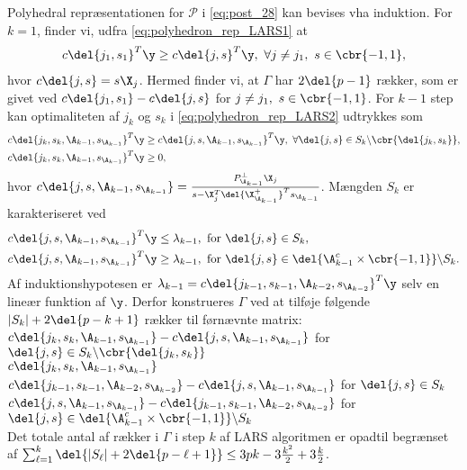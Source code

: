 Polyhedral repræsentationen for \(\mathcal{P}\) i \eqref{eq:post_28} kan bevises vha induktion.
For \(k=1\), finder vi, udfra \eqref{eq:polyhedron_rep_LARS1} at
\begin{align*}
c \del{j_1, s_1}^T \y \geq c \del{j,s}^T \y, \ \forall j \neq j_1, \ s \in \cbr{-1,1},
\end{align*}
hvor \(c \del{j,s} = s \X_j\).
Hermed finder vi, at \(\Gamma\) har \(2 \del{p-1}\) rækker, som er givet ved \(c \del{j_1, s_1} - c \del{j, s}\) for \(j \neq j_1, \ s \in \cbr{-1,1}\).
For \(k-1\) step kan optimaliteten af \(j_k\) og \(s_k\) i \eqref{eq:polyhedron_rep_LARS2} udtrykkes som
\begin{align*}
c \del{j_k, s_k, \A_{k-1}, s_{\A_{k-1}}}^T \y &\geq c \del{j, s, \A_{k-1}, s_{\A_{k-1}}}^T \y, \ \forall \del{j,s} \in S_k \backslash \cbr{\del{j_k, s_k}}, \\
c \del{j_k, s_k, \A_{k-1}, s_{\A_{k-1}}}^T \y &\geq 0,
\end{align*}
hvor \(c \del{j, s, \A_{k-1}, s_{\A_{k-1}}} = \frac{P_{\A_{k-1}}^\perp \X_j}{s - \X_j^T \del{\X_{\A_{k-1}}^+}^T s_{\A_{k-1}}}\).
Mængden \(S_k\) er karakteriseret ved
\begin{align*}
c \del{j, s, \A_{k-1}, s_{\A_{k-1}}}^T \y &\leq \lambda_{k-1}, \ \text{for } \del{j,s} \in S_k, \\
c \del{j, s, \A_{k-1}, s_{\A_{k-1}}}^T \y &\geq \lambda_{k-1}, \ \text{for } \del{j,s} \in \del{\A_{k-1}^c \times \cbr{-1,1}} \backslash S_k.
\end{align*}
Af induktionshypotesen er \(\lambda_{k-1} = c \del{j_{k-1}, s_{k-1}, \A_{k-2}, s_{\A_{k-2}}}^T \y\) selv en lineær funktion af \(\y\).
Derfor konstrueres \(\Gamma\) ved at tilføje følgende \(\vert S_k \vert + 2 \del{p-k+1}\) rækker til førnævnte matrix: 
\(c \del{j_k, s_k, \A_{k-1}, s_{\A_{k-1}}} - c \del{j, s, \A_{k-1}, s_{\A_{k-1}}}\) for \(\del{j,s} \in S_k \backslash \cbr{\del{j_k, s_k}}\) \\
\(c \del{j_k, s_k, \A_{k-1}, s_{\A_{k-1}}}\) \\
\(c \del{j_{k-1}, s_{k-1}, \A_{k-2}, s_{\A_{k-2}}}  - c \del{j, s, \A_{k-1}, s_{\A_{k-1}}}\) for \(\del{j,s} \in S_k\) \\
\(c \del{j, s, \A_{k-1}, s_{\A_{k-1}}} - c \del{j_{k-1}, s_{k-1}, \A_{k-2}, s_{\A_{k-2}}}\) for \(\del{j,s} \in \del{\A_{k-1}^c \times \cbr{-1,1}} \backslash S_k\) \\
Det totale antal af rækker i \(\Gamma\) i step \(k\) af LARS algoritmen er opadtil begrænset af \(\sum_{\ell=1}^k \del{\vert S_\ell \vert + 2 \del{p - \ell + 1}} \leq 3 pk - 3 \frac{k^2}{2} + 3 \frac{k}{2}\).